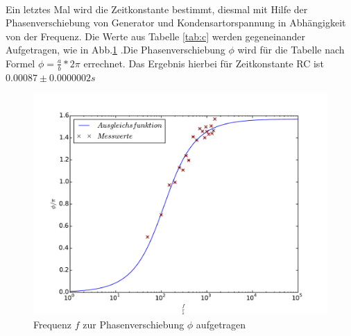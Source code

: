 \\
\FloatBarrier
Ein letztes Mal wird die Zeitkonstante bestimmt, diesmal mit Hilfe der Phasenverschiebung von Generator und Kondensartorspannung in Abhängigkeit von der Frequenz.
Die Werte aus Tabelle \ref{tab:c} werden gegeneinander Aufgetragen, wie in Abb.\ref{abb:c} .Die Phasenverschiebung $\phi$ wird für
die Tabelle nach Formel $\phi=\frac{a}{b}*2\pi$ errechnet.
Das Ergebnis hierbei für Zeitkonstante RC ist $0.00087\pm0.0000002 s$
\begin{figure}[h]
  \centering
  \includegraphics[width=1\textwidth]{c.pdf}
  \caption{Frequenz $f$ zur Phasenverschiebung $\phi$ aufgetragen}
  \label{abb:c}
\end{figure}
